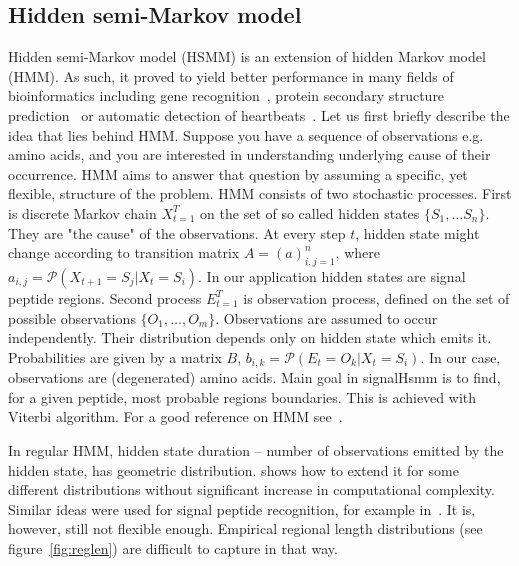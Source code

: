 \documentclass[fleqn,10pt,twoside]{gcb15submission}
\begin{document}
\subsection*{Hidden semi-Markov model}
Hidden semi-Markov model (HSMM) is an extension of hidden Markov model (HMM).
As such, it proved to yield better performance in many fields of bioinformatics including
gene recognition~\citep{Pachter02applicationsof}, protein secondary structure prediction~\citep{16571137}
or automatic detection of heartbeats~\citep{7043102}.
Let us first briefly describe the idea that lies behind HMM. 
Suppose you have a sequence of observations e.g. amino acids, and you are interested in understanding underlying cause of their occurrence. 
HMM aims to answer that question by assuming a specific, yet flexible, structure of the problem.
HMM consists of two stochastic processes. First is discrete Markov chain $X_{t=1}^T$ on the set of so called hidden states $\{S_1, \dots S_n\}$.
They are "the cause" of the observations. At every step $t$, hidden state might change according to transition matrix
$A= (a)_{i,j=1}^n$, where $a_{i,j} = \mathcal{P}(X_{t+1} = S_j | X_t = S_i)$. In our application hidden states are signal peptide regions.
Second process $E_{t=1}^T$ is observation process, defined on the set of possible observations $\{O_1, \dots, O_m\}$. 
Observations are assumed to occur independently. Their distribution depends only on hidden state which emits it. 
Probabilities are given by a matrix $B$, $b_{i,k} = \mathcal{P}(E_t = O_k | X_t = S_i)$.
In our case, observations are (degenerated) amino acids.
Main goal in signalHsmm is to find, for a given peptide, most probable regions boundaries. This is achieved with
Viterbi algorithm.
For a good reference on HMM see~\citep{1989rabinera}.

In regular HMM, hidden state duration -- number of observations emitted by the hidden state, has geometric distribution.
\citep{Durbin98biologicalsequence} shows how to extend it for some different distributions without significant increase in computational 
complexity. Similar ideas were used for signal peptide recognition, for example in~\citep{2004klla}. 
It is, however, still not flexible enough. Empirical regional length distributions (see figure~\ref{fig:reglen})
are difficult to capture in that way.
\end{document}
